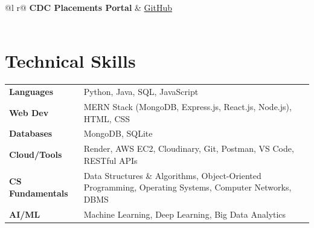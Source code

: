 \documentclass[a4paper,10.5pt]{article}
\begin{document}
\begin{tabularx}{\linewidth}{@{}l r@{}}
\textbf{CDC Placements Portal} & \hfill \href{https://github.com/Seshmanuvarthi/Placement_Portal}{GitHub} \\[-1pt]
 \\[2pt]
\end{tabularx}



\section{Technical Skills}
\vspace{1pt}
\begin{tabularx}{\linewidth}{@{}l X@{}}
\textbf{Languages}   & Python, Java, SQL, JavaScript \\[2pt]
\textbf{Web Dev}     & MERN Stack (MongoDB, Express.js, React.js, Node.js), HTML, CSS \\[2pt]
\textbf{Databases}   & MongoDB, SQLite \\[2pt]
\textbf{Cloud/Tools} & Render, AWS EC2, Cloudinary, Git, Postman, VS Code, RESTful APIs \\[2pt]
\textbf{CS Fundamentals} & Data Structures \& Algorithms, Object-Oriented Programming, Operating Systems, Computer Networks, DBMS \\[2pt]
\textbf{AI/ML}       & Machine Learning, Deep Learning, Big Data Analytics \\
\end{tabularx}
\end{document}
